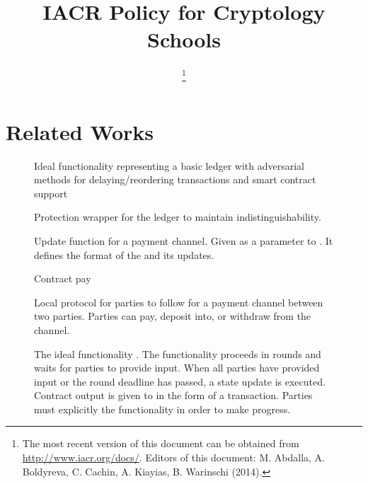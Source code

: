 \documentclass[11pt]{article}
\title{\bf IACR Policy for Cryptology Schools}
\author{\mbox{}}
\date{\lastupdate
 \footnote{The most recent version of this document
    can be obtained from \protect\url{http://www.iacr.org/docs/}.\newline
  Editors of this document: M. Abdalla, A. Boldyreva, C. Cachin, A. Kiayias, B. Warinschi (2014).}}
\begin{document}
\pagestyle{fancy}

\maketitle

\section{Related Works}


\begin{figure}[!ht]
	
	\label{fig:functionality:exectx}
\end{figure}

\begin{figure}[!ht]

\label{fig:functionality:execcreate}
\end{figure}

\begin{figure}[!ht]

	\caption{Ideal functionality representing a basic ledger with adversarial methods for delaying/reordering transactions and smart contract support}
	\label{fig:functionality:ledger}
\end{figure}

\begin{figure}
	
	\caption{Protection wrapper for the ledger to maintain indistinguishability.}
\end{figure}

\begin{figure}
	
	\caption{Update function for a payment channel. Given as a parameter to \Fstate. It defines the format of the  and its updates.}
\end{figure}

\begin{figure}
	
	\caption{Contract pay}
\end{figure}

\begin{figure}
	
	\caption{Local protocol for parties to follow for a payment channel between two parties. Parties can pay, deposit into, or withdraw from the channel.}
\end{figure}

\begin{figure}
	
	\caption{The ideal functionality \Fstate. The functionality proceeds in rounds and waits for parties to provide input. When all parties have provided input or the round deadline has passed, a state update is executed. Contract output is given to \Gledger in the form of a transaction. Parties must explicitly  the functionality in order to make progress. }
\end{figure}
\end{document}
